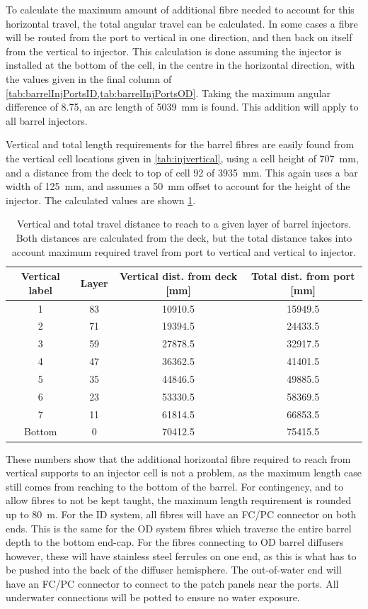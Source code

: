 \documentclass[a4paper,11pt]{article}
\begin{document}
To calculate the maximum amount of additional fibre needed to account for this horizontal travel, the total angular travel can be calculated. In some cases a fibre will be routed from the port to vertical in one direction, and then back on itself from the vertical to injector. This calculation is done assuming the injector is installed at the bottom of the cell, in the centre in the horizontal direction, with the values given in the final column of \cref{tab:barrelInjPortsID,tab:barrelInjPortsOD}. Taking the maximum angular difference of 8.75\degree, an arc length of 5039~mm is found. This addition will apply to all barrel injectors. 

Vertical and total length requirements for the barrel fibres are easily found from the vertical cell locations given in \cref{tab:injvertical}, using a cell height of 707~mm, and a distance from the deck to top of cell 92 of 3935~mm. This again uses a bar width of 125~mm, and assumes a 50~mm offset to account for the height of the injector. The calculated values are shown \cref{tab:barrelLength}.
\begin{table}[h!]
\centering
\begin{tabular}{cccc}\toprule
Vertical label	&	Layer	&	Vertical dist. from deck [mm]	&	Total dist. from port [mm]	\\	\midrule
	1			&	83		&	10910.5							&	15949.5	\\
	2			&	71		&	19394.5							&	24433.5	\\	
	3			&	59		&	27878.5							&	32917.5	\\
	4			&	47		&	36362.5							&	41401.5	\\
	5			&	35		&	44846.5							&	49885.5	\\
	6			&	23		&	53330.5							&	58369.5	\\
	7			&	11		&	61814.5							&	66853.5	\\
	Bottom		&	0		&	70412.5							&	75415.5	\\ \bottomrule
\end{tabular}
\caption{Vertical and total travel distance to reach to a given layer of barrel injectors. Both distances are calculated from the deck, but the total distance takes into account maximum required travel from port to vertical and vertical to injector.}\label{tab:barrelLength}
\end{table}
These numbers show that the additional horizontal fibre required to reach from vertical supports to an injector cell is not a problem, as the maximum length case still comes from reaching to the bottom of the barrel. For contingency, and to allow fibres to not be kept taught, the maximum length requirement is rounded up to 80~m. For the ID system, all fibres will have an FC/PC connector on both ends. This is the same for the OD system fibres which traverse the entire barrel depth to the bottom end-cap. For the fibres connecting to OD barrel diffusers however, these will have stainless steel ferrules on one end, as this is what has to be pushed into the back of the diffuser hemisphere. The out-of-water end will have an FC/PC connector to connect to the patch panels near the ports. All underwater connections will be potted to ensure no water exposure.
\end{document}
